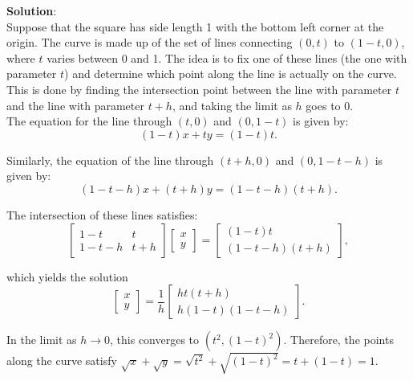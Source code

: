 \documentclass[10pt,a4paper]{article}
\begin{document}
\textbf{Solution}:\\
Suppose that the square has side length 1 with the bottom left corner at the origin. The curve is made up of the set of lines connecting $(0, t)$ to $(1-t, 0)$, where $t$ varies between 0 and 1. The idea is to fix one of these lines (the one with parameter $t$) and determine which point along the line is actually on the curve. This is done by finding the intersection point between the line with parameter $t$ and the line with parameter $t + h$, and taking the limit as $h$ goes to 0.\\

The equation for the line through $(t, 0)$ and $(0, 1-t)$ is given by:
\begin{equation}
\label{eq:line_t}
(1-t)x + ty = (1-t)t.
\end{equation}

Similarly, the equation of the line through $(t+h, 0)$ and $(0, 1-t-h)$ is given by:
\begin{equation}
\label{eq:line_th}
(1-t-h)x + (t+h)y = (1-t-h)(t+h).
\end{equation}

The intersection of these lines satisfies:
\begin{equation}
\label{eq:int_prob}
\left[\begin{array}{cc}
1-t & t\\1-t-h & t+h
\end{array}\right]
\left[\begin{array}{c}
x\\y
\end{array}\right]
=
\left[\begin{array}{c}
(1-t)t\\(1-t-h)(t+h)
\end{array}\right],
\end{equation}

which yields the solution
\begin{equation}
\label{eq:int_sol}
\left[\begin{array}{c}
x\\y
\end{array}\right]
=
\frac{1}{h}\left[\begin{array}{c}
ht(t+h)\\
h(1-t)(1-t-h)
\end{array}\right].
\end{equation}

In the limit as $h \rightarrow 0$, this converges to $(t^2, (1-t)^2)$. Therefore, the points along the curve satisfy $\sqrt{x} + \sqrt{y} = \sqrt{t^2} + \sqrt{(1-t)^2} = t + (1-t) = 1$.
\end{document}
